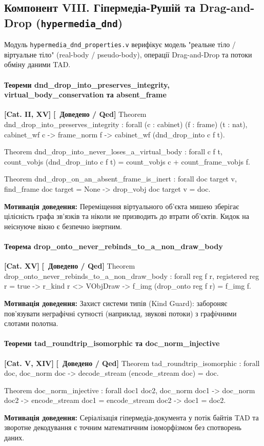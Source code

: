 \documentclass{article}
\let\originalfootnotesize\footnotesize
\let\oldverbatim\verbatim
\let\oldendverbatim\endverbatim
\renewenvironment{verbatim}{\originalfootnotesize\oldverbatim}{\oldendverbatim}
\newcommand{\thmcategory}[1]{{\small\textbf{\color{coreblue}[#1]}}}
\newcommand{\thmproven}{{\small\textbf{\color{productgreen}[\checkmark\ Доведено / Qed]}}}
\newcommand{\thmmotivation}[1]{%
  \par\smallskip\noindent\colorbox{boxbg}{\parbox{\dimexpr\linewidth-2\fboxsep\relax}{%
    \small\textbf{Мотивація доведення:} #1%
  }}\par\medskip
}
\begin{document}
\subsection[Компонент VIII. Гіпермедіа TAD / DND]{Компонент VIII. Гіпермедіа-Рушій та Drag-and-Drop (\texttt{hypermedia\_dnd})}

Модуль \texttt{hypermedia\_dnd\_properties.v} верифікує модель "реальне тіло / віртуальне тіло" (real-body / pseudo-body), операції Drag-and-Drop та потоки обміну даними TAD.

\paragraph{Теореми dnd\_drop\_into\_preserves\_integrity, virtual\_body\_conservation та absent\_frame} \thmcategory{Cat. II, XV} \thmproven
\begin{verbatim}
Theorem dnd_drop_into_preserves_integrity :
  forall (c : cabinet) (f : frame) (t : nat),
  cabinet_wf c -> frame_norm f ->
  cabinet_wf (dnd_drop_into c f t).

Theorem dnd_drop_into_never_loses_a_virtual_body : forall c f t,
  count_vobjs (dnd_drop_into c f t) = count_vobjs c + count_frame_vobjs f.

Theorem dnd_drop_on_an_absent_frame_is_inert : forall doc target v,
  find_frame doc target = None -> drop_vobj doc target v = doc.
\end{verbatim}
\thmmotivation{Переміщення віртуального об'єкта мишею зберігає цілісність графа зв'язків та ніколи не призводить до втрати об'єктів. Кидок на неіснуюче вікно є безпечно інертним.}

\paragraph{Теорема drop\_onto\_never\_rebinds\_to\_a\_non\_draw\_body} \thmcategory{Cat. XV} \thmproven
\begin{verbatim}
Theorem drop_onto_never_rebinds_to_a_non_draw_body :
  forall reg f r,
  registered reg r = true -> r_kind r <> VObjDraw ->
  f_img (drop_onto reg f r) = f_img f.
\end{verbatim}
\thmmotivation{Захист системи типів (Kind Guard): забороняє пов'язувати неграфічні сутності (наприклад, звукові потоки) з графічними слотами полотна.}

\paragraph{Теореми tad\_roundtrip\_isomorphic та doc\_norm\_injective} \thmcategory{Cat. V, XIV} \thmproven
\begin{verbatim}
Theorem tad_roundtrip_isomorphic :
  forall doc, doc_norm doc -> decode_stream (encode_stream doc) = doc.

Theorem doc_norm_injective : forall doc1 doc2,
  doc_norm doc1 -> doc_norm doc2 ->
  encode_stream doc1 = encode_stream doc2 -> doc1 = doc2.
\end{verbatim}
\thmmotivation{Серіалізація гіпермедіа-документа у потік байтів TAD та зворотне декодування є точним математичним ізоморфізмом без спотворень даних.}
\end{document}
